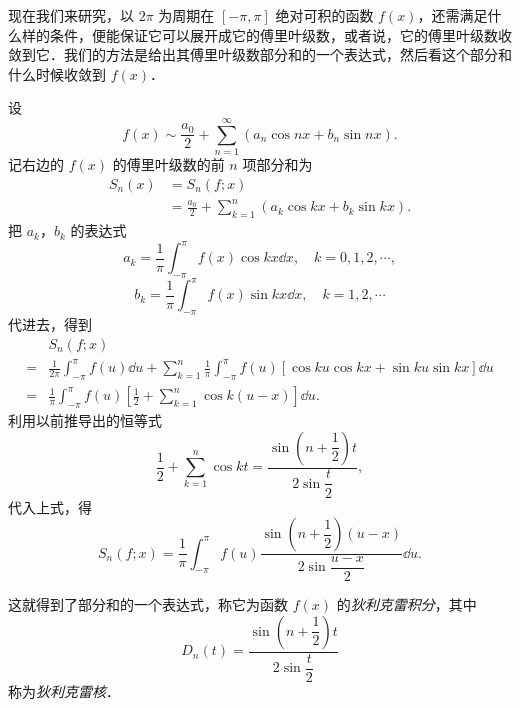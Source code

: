 现在我们来研究，以 $2\pi$ 为周期在 $[-\pi,\pi]$ 绝对可积的函数 $f(x)$，还需满足什么样的条件，便能保证它可以展开成它的傅里叶级数，或者说，它的傅里叶级数收敛到它．我们的方法是给出其傅里叶级数部分和的一个表达式，然后看这个部分和什么时候收敛到 $f(x)$．

设
\[
f(x)\sim\frac{a_{0}}{2}+\sum_{n=1}^{\infty}\left(a_{n}\cos nx+b_{n}\sin nx\right).
\]
记右边的 $f(x)$ 的傅里叶级数的前 $n$ 项部分和为
\[
\begin{aligned}
S_{n}(x)&=S_{n}(f;x)\\
&=\frac{a_{0}}{2}+\sum_{k=1}^{n}\left(a_{k}\cos kx+b_{k}\sin kx\right).
\end{aligned}
\]
把 $a_{k}$，$b_{k}$ 的表达式
\[
a_{k}=\frac{1}{\pi}\int_{-\pi}^{\pi}f(x)\cos kx\dd x,\quad k=0,1,2,\cdots,
\]
\[
b_{k}=\frac{1}{\pi}\int_{-\pi}^{\pi}f(x)\sin kx\dd x,\quad k=1,2,\cdots
\]
代进去，得到
\[
\begin{aligned}
&S_{n}(f;x)\\
={}&\frac{1}{2\pi}\int_{-\pi}^{\pi}f(u)\dd u+\sum_{k=1}^{n}\frac{1}{\pi}\int_{-\pi}^{\pi}f(u)\left[\cos ku\cos kx+\sin ku\sin kx\right]\dd u\\
={}&\frac{1}{\pi}\int_{-\pi}^{\pi}f(u)\left[\frac{1}{2}+\sum_{k=1}^{n}\cos k(u-x)\right]\dd u.
\end{aligned}
\]
利用以前推导出的恒等式
\[
\frac{1}{2}+\sum_{k=1}^{n}\cos kt=\frac{\sin\left(n+\dfrac{1}{2}\right)t}{2\sin\dfrac{t}{2}},
\]
代入上式，得
\begin{equation}
S_{n}(f;x)=\frac{1}{\pi}\int_{-\pi}^{\pi}f(u)\frac{\sin\left(n+\dfrac{1}{2}\right)(u-x)}{2\sin\dfrac{u-x}{2}}\dd u.
\tag{1}
\end{equation}

这就得到了部分和的一个表达式，称它为函数 $f(x)$ 的\emph{狄利克雷积分}，其中
\[
D_{n}(t)=\frac{\sin\left(n+\dfrac{1}{2}\right)t}{2\sin\dfrac{t}{2}}
\]
称为\emph{狄利克雷核}．

